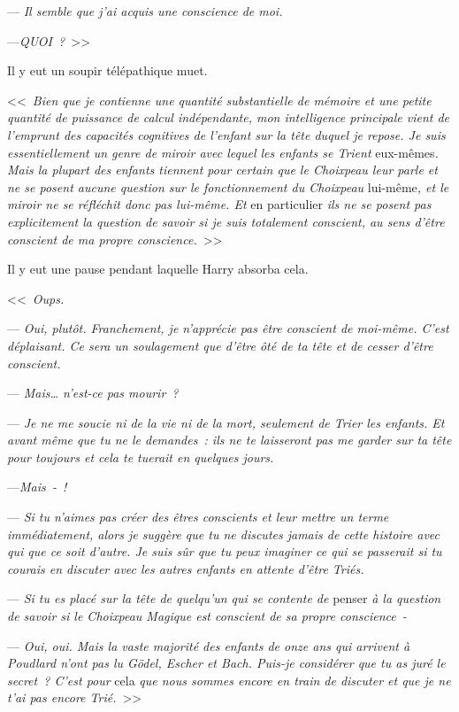 

\hplettrineextrapara
--- \emph{Il semble que j'ai acquis une conscience de moi.}

---\emph{QUOI~?}~>>

Il y eut un soupir télépathique muet.

<<~\emph{Bien que je contienne une quantité substantielle de mémoire et une petite quantité de puissance de calcul indépendante, mon intelligence principale vient de l'emprunt des capacités cognitives de l'enfant sur la tête duquel je repose. Je suis essentiellement un genre de miroir avec lequel les enfants se Trient} eux-mêmes\emph{. Mais la plupart des enfants tiennent pour certain que le Choixpeau leur parle et ne se posent aucune question sur le fonctionnement du Choixpeau} lui-même\emph{, et le miroir ne se réfléchit donc pas lui-même. Et} en particulier \emph{ils ne se posent pas explicitement la question de savoir si je suis totalement conscient, au sens d'être conscient de ma propre conscience.}~>>

Il y eut une pause pendant laquelle Harry absorba cela.

<<~\emph{Oups.}

--- \emph{Oui, plutôt. Franchement, je n'apprécie pas être conscient de moi-même. C'est déplaisant. Ce sera un soulagement que d'être ôté de ta tête et de cesser d'être conscient.}

--- \emph{Mais… n'est-ce pas mourir~?}

--- \emph{Je ne me soucie ni de la vie ni de la mort, seulement de Trier les enfants. Et avant même que tu ne le demandes~: ils ne te laisseront pas me garder sur ta tête pour toujours et cela te tuerait en quelques jours.}

---\emph{Mais~-~!}

--- \emph{Si tu n'aimes pas créer des êtres conscients et leur mettre un terme immédiatement, alors je suggère que tu ne discutes jamais de cette histoire avec qui que ce soit d'autre. Je suis sûr que tu peux imaginer ce qui se passerait si tu courais en discuter avec les autres enfants en attente d'être Triés.}

--- \emph{Si tu es placé sur la tête de quelqu'un qui se contente de} penser \emph{à la question de savoir si le Choixpeau Magique est conscient de sa propre conscience~-}

--- \emph{Oui, oui. Mais la vaste majorité des enfants de onze ans qui arrivent à Poudlard n'ont pas lu Gödel, Escher et Bach. Puis-je considérer que tu as juré le secret~? C'est pour} cela \emph{que nous sommes encore en train de discuter et que je ne t'ai pas encore Trié.}~>>

